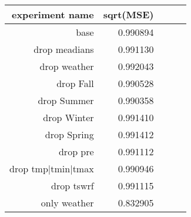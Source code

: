 \begin{tabular}{rrrrr}
\toprule
 experiment name & sqrt(MSE)  \\
\midrule
base & 0.990894 \\
drop meadians & 0.991130 \\
drop weather & 0.992043 \\
drop Fall & 0.990528  \\
drop Summer & 0.990358  \\
drop Winter & 0.991410  \\
drop Spring & 0.991412  \\
drop pre & 0.991112  \\
drop tmp|tmin|tmax & 0.990946 \\
drop tswrf & 0.991115 \\
only weather & 0.832905 \\
\bottomrule
\end{tabular}
